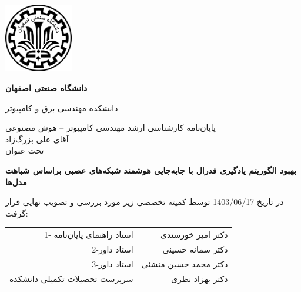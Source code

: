 \thispagestyle{empty}
\begin{center}
\includegraphics[height=3cm]{iut_logo.png}
\vspace{0.4cm}

\textbf{دانشگاه صنعتی اصفهان}\\
\vspace{0.4cm}

{\large
	دانشکده مهندسی برق و کامپیوتر
}
\vspace{1.8cm}

\vfill

{\Large
	پایان‌نامه کارشناسی ارشد مهندسی کامپیوتر --
	هوش مصنوعی ‎\\
	\vspace{.2cm}
	آقای علی بزرگ‌زاد
	\\
	\vspace{.3cm}
	تحت عنوان\\
}


\end{center}
\vfill
\vspace{2.5cm}

{\large
	\noindent
	\textbf{
	بهبود الگوریتم یادگیری فدرال با جابه‌جایی هوشمند شبکه‌های عصبی براساس شباهت مدل‌ها
	}
}

\vspace*{2cm}

در تاریخ 1403/06/17 توسط کمیته تخصصی زیر مورد بررسی و تصویب نهایی قرار گرفت:\\
\vspace{0.8cm}

{\normalsize
	
	\begin{tabular}{rr}
	\vspace*{.8cm}
	1- استاد راهنمای پایان‌نامه  & \hspace{2cm} دکتر امیر خورسندی \\
	\vspace{.8cm}
	2-استاد داور &\hspace{2cm} دکتر سمانه حسینی \\
	\vspace{.8cm}
	3-استاد داور &\hspace{2cm} دکتر محمد حسین منشئی \\
	\vspace{.8cm}
	سرپرست تحصیلات تکمیلی دانشکده &\hspace{2cm} دکتر بهزاد نظری \\
	\end{tabular}
}
\restoregeometry
\pagebreak

